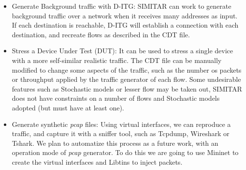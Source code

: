 \begin{itemize}

\item Generate Background traffic with D-ITG: SIMITAR can work to generate background traffic over a network when it receives many addresses as input. If each destination is reachable, D-ITG will establish a connection with each destination, and recreate flows as described in the CDT file. 

\item Stress a Device Under Test (DUT): It can be used to stress a single device with a more self-similar realistic traffic. The CDT file can be manually modified to change some aspects of the traffic, such as the number os packets or throughput applied by the traffic generator of each flow. Some undesirable features such as Stochastic models or lesser flow may be taken out, SIMITAR does not have constraints on a number of flows and Stochastic models adopted (but must have at least one).

\item Generate synthetic \textit{pcap} files: Using virtual interfaces, we can reproduce a traffic, and capture it with a sniffer tool, such as Tcpdump, Wireshark or Tshark. We plan to automatize this process as a future work, with an operation mode of \textit{pcap} generator. To do this we are going to use Mininet to create the virtual interfaces and Libtins to inject packets.

\end{itemize}




